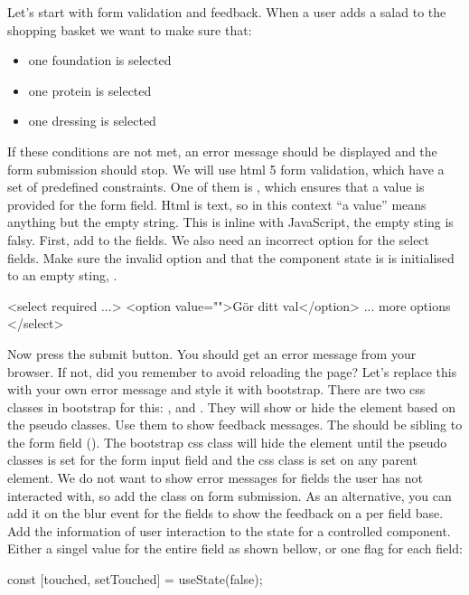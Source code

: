 \documentclass[fleqn, article, a4paper]{memoir}
\begin{document}
\begin{Assignments}

\item Let's start with form validation and feedback. When a user adds a salad to the shopping basket we want to make sure that:
\begin{itemize}
  \item one foundation is selected
  \item one protein is selected
  \item one dressing is selected
\end{itemize}
If these conditions are not met, an error message should be displayed and the form submission should stop. We will use html 5 form validation, which have a set of predefined constraints. One of them is , which ensures that a value is provided for the form field. Html is text, so in this context ``a value'' means anything but the empty string. This is inline with JavaScript, the empty sting is falsy. First, add  to the  fields. We also need an incorrect option for the select fields. Make sure the invalid option and that the component state is is initialised to an empty sting, .
\begin{Code}
<select required ...>
  <option value="">Gör ditt val</option>
  ... more options
</select>
\end{Code}
Now press the submit button. You should get an error message from your browser. If not, did you remember  to avoid reloading the page? Let's replace this with your own error message and style it with bootstrap. There are two css classes in bootstrap for this: , and . They will show or hide the element based on the  pseudo classes. Use them to show feedback messages. The  should be sibling to the form field (). The bootstrap css class will hide the element until the pseudo classes  is set for the form input field and the css class  is set on any parent element. We do not want to show error messages for fields the user has not interacted with, so add the  class on form submission. As an alternative, you can add it on the blur event for the fields to show the feedback on a per field base.  Add the information of user interaction to the state for a controlled component. Either a singel value for the entire field as shown bellow, or one flag for each field:
\begin{Code}
const [touched, setTouched] = useState(false);


\end{Code}
\end{Assignments}
\end{document}
